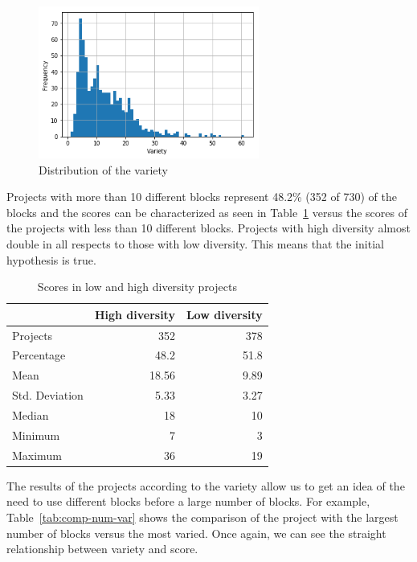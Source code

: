 \documentclass[a4paper]{article}
\begin{document}
\begin{figure}
\begin{center}
\includegraphics[height=5cm]{fig1}
\caption{Distribution of the variety}
\label{fig:var-dist}
\end{center}
\end{figure}

Projects with more than 10 different blocks represent 48.2\% (352 of 730) of the blocks and the scores can be characterized as seen in Table~\ref{tab:comparison} versus the scores of the projects with less than 10 different blocks. Projects with high diversity almost double in all respects to those with low diversity. This means that the initial hypothesis is true.

\begin{table}
\begin{center}
\caption{Scores in low and high diversity projects}
\bigskip
\label{tab:comparison}
\begin{tabular}{|l|r|r|}
\hline
& High diversity & Low diversity \\ \hline
Projects & 352 & 378\\ \hline
Percentage & 48.2 & 51.8\\ \hline
Mean & 18.56 & 9.89\\ \hline
Std. Deviation & 5.33 & 3.27\\ \hline
Median & 18 & 10\\ \hline
Minimum & 7 & 3\\ \hline
Maximum & 36 & 19\\ \hline
\end{tabular}
\end{center}
\end{table}

The results of the projects according to the variety allow us to get an idea of the need to use different blocks before a large number of blocks. For example, Table~\ref{tab:comp-num-var} shows the comparison of the project with the largest number of blocks versus the most varied. Once again, we can see the straight relationship between variety and score.
\end{document}
